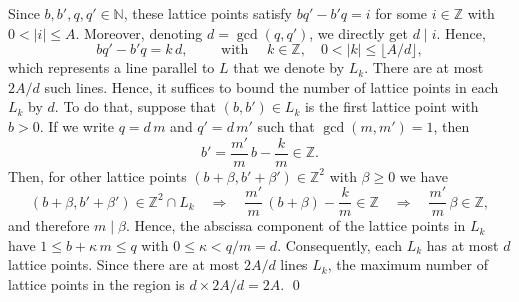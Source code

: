 \documentclass[11pt,reqno]{amsart}
\theoremstyle{definition}
\numberwithin{equation}{section}
\theoremstyle{remark}
\begin{document}
Since $b,b',q,q' \in \mathbb{N}$, 
these lattice points satisfy $bq'-b'q = i$ for some $i \in \mathbb Z$ with $0 < |i| \leq A$.
Moreover, 
denoting $d = \operatorname{gcd}(q,q')$, 
we directly get $d \mid i$.
Hence, 
\begin{equation}\label{eq:Lines_Li}
    bq'-b'q = k \, d, 
    \qquad \text{ with } \quad  k \in \mathbb Z,
    \quad 
    0 < |k| \leq \lfloor A/d \rfloor,
\end{equation}
which represents a line parallel to $L$ that we denote by $L_k$.
There are at most $2A/d$ such lines. 
Hence, it suffices to bound the number of lattice points in each $L_k$ by $d$.
To do that, suppose that $(b,b') \in L_k$ is the first lattice point with $b > 0$. 
If we write $q = d \, m$ and $q' = d\, m'$ such that $\operatorname{gcd}(m,m') = 1$, 
then 
\begin{equation}
    b' = \frac{m'}{m}\, b - \frac{k}{m} \in \mathbb Z.
\end{equation}
Then, for other lattice points $(b + \beta, b' + \beta') \in \mathbb Z^2$ with $\beta \geq 0$ we have
\begin{equation}
    (b + \beta, b' + \beta') \in \mathbb Z^2 \cap L_k
    \quad \Longrightarrow \quad
    \frac{m'}{m}\, (b + \beta) - \frac{k}{m}
    \in \mathbb Z 
    \quad \Longrightarrow \quad
    \frac{m'}{m} \, \beta \in \mathbb Z,
\end{equation}
and therefore $m \mid \beta$. 
Hence, the abscissa component of the lattice points in $L_k$ have $1 \leq b + \kappa \, m \leq q$ with $0 \leq \kappa < q/m = d$. 
Consequently, each $L_k$ has at most $d$ lattice points.
Since there are at most $2A/d$ lines $L_k$, 
the maximum number of lattice points in the region is $d \times 2A/d = 2A$. 
\qed
\end{document}
